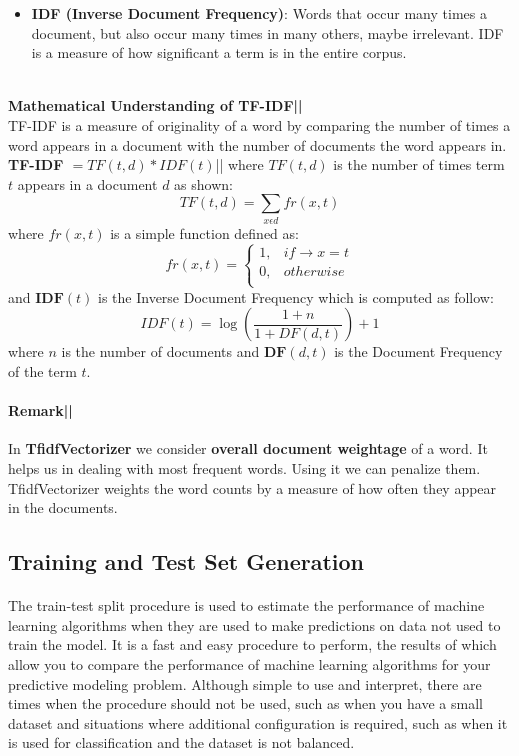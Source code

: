 \documentclass[11.5pt]{article}
\begin{document}
\begin{multicols}{2}
\begin{itemize}
    \item \textbf{IDF (Inverse Document Frequency)}: Words that occur many times a document, but also occur many times in many others, maybe irrelevant. IDF is a measure of how significant a term is in the entire corpus.
\end{itemize}\\
\newline
\textbf{Mathematical Understanding of TF-IDF||}\\
TF-IDF is a measure of originality  of a word by comparing the number of times a word appears in a document with the number of documents the word appears in.\\
\newline
\textbf{TF-IDF $= TF(t, d) * IDF(t)$}|| where $TF(t, d)$ is the number of times term $t$ appears in a document $d$ as shown:
\begin{equation}
    TF(t,d) = \sum_{x \epsilon d} fr(x,t)
\end{equation}
where $fr(x,t)$ is a simple function defined as:
\begin{equation}
    fr(x,t) = 
    \begin{cases} 
      1, & if \rightarrow x=t\\
      0, & otherwise\\
   \end{cases}
\end{equation}
and $\textbf{IDF}(t)$ is the Inverse Document Frequency which is computed as follow:
\begin{equation}
    IDF(t) = \log(\frac{1+n}{1+DF(d,t)}) +  1
\end{equation}
where $n$ is the number of documents and $\textbf{DF}(d,t)$ is the Document Frequency of the term $t$.
\paragraph{Remark||}
In \textbf{TfidfVectorizer} we consider \textbf{overall document weightage} of a word. It helps us in dealing with most frequent words. Using it we can penalize them. TfidfVectorizer weights the word counts by a measure of how often they appear in the documents.
\subsection{Training and Test Set Generation}
\paragraph{}
The train-test split procedure is used to estimate the performance of machine learning algorithms when they are used to make predictions on data not used to train the model.
\newline
It is a fast and easy procedure to perform, the results of which allow you to compare the performance of machine learning algorithms for your predictive modeling problem. Although simple to use and interpret, there are times when the procedure should not be used, such as when you have a small dataset and situations where additional configuration is required, such as when it is used for classification and the dataset is not balanced.\cite{traintestsplit}

\end{multicols}
\end{document}
